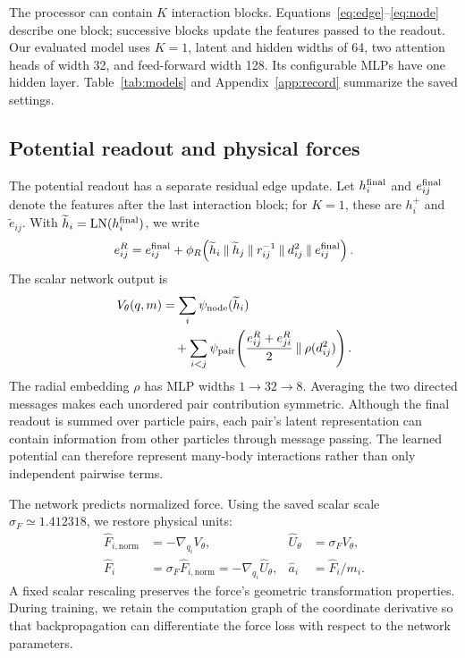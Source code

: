 \documentclass[10pt,letterpaper,twocolumn]{article}
\newcommand{\LN}{\operatorname{LN}}
\newcommand{\cat}{\mathbin{\Vert}}
\newcommand{\Fhat}{\widehat F}
\newcommand{\Uhat}{\widehat U}
\newcommand{\ahat}{\widehat a}
\numberwithin{equation}{section}
\begin{document}
The processor can contain $K$ interaction blocks. Equations~\eqref{eq:edge}--\eqref{eq:node}
describe one block; successive blocks update the features passed to the readout. Our evaluated
model uses $K=1$, latent and hidden widths of 64, two attention heads of width 32, and feed-forward
width 128. Its configurable MLPs have one hidden layer. Table~\ref{tab:models} and
Appendix~\ref{app:record} summarize the saved settings.

\subsection{Potential readout and physical forces}

The potential readout has a separate residual edge update. Let $h_i^{\rm final}$ and
$e_{ij}^{\rm final}$ denote the features after the last interaction block; for $K=1$, these are
$h_i^+$ and $\widetilde e_{ij}$. With $\widetilde h_i=\LN(h_i^{\rm final})$, we write
\begin{equation}
e^R_{ij}=e^{\rm final}_{ij}+\phi_R\!\left(
\widetilde h_i\cat\widetilde h_j\cat r_{ij}^{-1}\cat d_{ij}^2\cat e^{\rm final}_{ij}\right).
\label{eq:readoutedge}
\end{equation}
The scalar network output is
\begin{equation}
\begin{aligned}
V_\theta(q,m)&=\sum_i\psi_{\rm node}(\widetilde h_i)\\
&\quad+\sum_{i<j}\psi_{\rm pair}\!\left(
\frac{e^R_{ij}+e^R_{ji}}{2}\cat\rho(d_{ij}^2)\right).
\end{aligned}
\label{eq:potential}
\end{equation}
The radial embedding $\rho$ has MLP widths $1\to32\to8$. Averaging the two directed messages
makes each unordered pair contribution symmetric. Although the final readout is summed over particle pairs, each pair's latent representation can contain 
information from other particles through message passing. The learned potential can therefore represent many-body interactions rather than only independent 
pairwise terms.

The network predicts normalized force. Using the saved scalar scale
$\sigma_F\simeq1.412318$, we restore physical units:
\begin{equation}
\begin{aligned}
\Fhat_{i,\mathrm{norm}}&=-\nabla_{q_i}V_\theta,&
\Uhat_\theta&=\sigma_F V_\theta,\\
\Fhat_i&=\sigma_F\Fhat_{i,\mathrm{norm}}=-\nabla_{q_i}\Uhat_\theta,&
\ahat_i&=\Fhat_i/m_i.
\end{aligned}
\label{eq:normalization}
\end{equation}
A fixed scalar rescaling preserves the force's geometric transformation properties. During training,
we retain the computation graph of the coordinate derivative so that backpropagation can
differentiate the force loss with respect to the network parameters.
\end{document}

